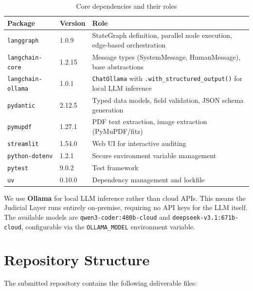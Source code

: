 \documentclass[12pt,a4paper]{article}
\begin{document}
\begin{table}[h]
\centering
\caption{Core dependencies and their roles}
\begin{tabular}{@{}llp{7cm}@{}}
\toprule
\textbf{Package} & \textbf{Version} & \textbf{Role} \\
\midrule
\texttt{langgraph}        & 1.0.9  & StateGraph definition, parallel node execution, edge-based orchestration \\
\texttt{langchain-core}   & 1.2.15 & Message types (SystemMessage, HumanMessage), base abstractions \\
\texttt{langchain-ollama} & 1.0.1  & \texttt{ChatOllama} with \texttt{.with\_structured\_output()} for local LLM inference \\
\texttt{pydantic}         & 2.12.5 & Typed data models, field validation, JSON schema generation \\
\texttt{pymupdf}          & 1.27.1 & PDF text extraction, image extraction (PyMuPDF/fitz) \\
\texttt{streamlit}        & 1.54.0 & Web UI for interactive auditing \\
\texttt{python-dotenv}    & 1.2.1  & Secure environment variable management \\
\texttt{pytest}           & 9.0.2  & Test framework \\
\texttt{uv}               & 0.10.0 & Dependency management and lockfile \\
\bottomrule
\end{tabular}
\end{table}

We use \textbf{Ollama} for local LLM inference rather than cloud APIs. This means the Judicial Layer runs entirely on-premise, requiring no API keys for the LLM itself. The available models are \texttt{qwen3-coder:480b-cloud} and \texttt{deepseek-v3.1:671b-cloud}, configurable via the \texttt{OLLAMA\_MODEL} environment variable.

\section{Repository Structure}

The submitted repository contains the following deliverable files:
\end{document}

